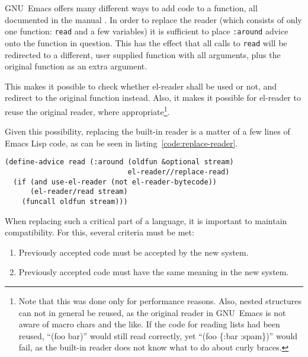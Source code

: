 \documentclass[a4paper,10pt,twoside]{report}
\newcommand{\el}{Emacs Lisp}
\newcommand{\elr}{el-reader}
\newcommand{\sym}[1]{\texttt{#1}}
\newcommand{\fun}[1]{\texttt{#1}}
\newcommand{\emacs}{GNU~Emacs}
\begin{document}
\emacs{} offers many different ways to add code to a function, all documented in
the manual \cite[Section 12.11 ``Advising Emacs Lisp
Functions'']{elisp-reference}.  In order to replace the reader (which consists
of only one function: \fun{read} and a few variables) it is sufficient to place
\sym{:around} advice onto the function in question.  This has the effect that
all calls to \fun{read} will be redirected to a different, user supplied
function with all arguments, plus the original function as an extra argument.

This makes it possible to check whether \elr{} shall be used or not, and
redirect to the original function instead.  Also, it makes it possible for
\elr{} to reuse the original reader, where appropriate\footnote{Note that this
  was done only for performance reasons.  Also, nested structures can not in
  general be reused, as the original reader in \emacs{} is not aware of macro
  chars and the like.  If the code for reading lists had been reused, ``(foo
  bar)'' would still read correctly, yet ``(foo \{:bar :spam\})'' would fail, as
  the built-in reader does not know what to do about curly braces.}.

Given this possibility, replacing the built-in reader is a matter of a few lines
of \el{} code, as can be seen in listing~\ref{code:replace-reader}.

\begin{lstlisting}[style=lispcode,caption={Replacing the built-in
    reader},label={code:replace-reader}]
(define-advice read (:around (oldfun &optional stream)
                             el-reader//replace-read)
  (if (and use-el-reader (not el-reader-bytecode))
      (el-reader/read stream)
    (funcall oldfun stream)))
\end{lstlisting}


When replacing such a critical part of a language, it is important to maintain
compatibility.  For this, several criteria must be met:

\begin{enumerate}
\item Previously accepted code must be accepted by the new system.
\item Previously accepted code must have the same meaning in the new system.
\end{enumerate}
\end{document}
